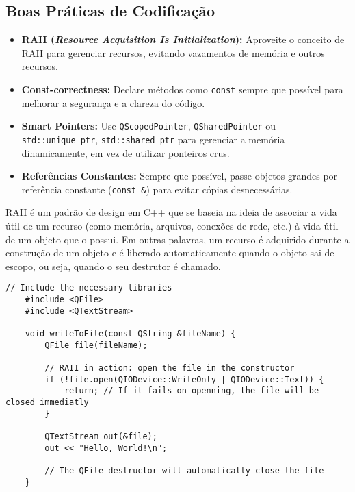 \documentclass[a4paper,11pt]{article}
\begin{document}
\subsection{Boas Práticas de Codificação}
\begin{itemize}
	\item \textbf{RAII (\textit{Resource Acquisition Is Initialization}):} Aproveite o conceito de RAII para gerenciar recursos, evitando vazamentos de memória e outros recursos.
	
	\item \textbf{Const-correctness:} Declare métodos como \texttt{const} sempre que possível para melhorar a segurança e a clareza do código.
	
	\item \textbf{Smart Pointers:} Use \texttt{QScopedPointer}, \texttt{QSharedPointer} ou \texttt{std::unique\_ptr}, \texttt{std::shared\_ptr} para gerenciar a memória dinamicamente, em vez de utilizar ponteiros crus.
	
	\item \textbf{Referências Constantes:} Sempre que possível, passe objetos grandes por referência constante (\texttt{const \&}) para evitar cópias desnecessárias.
\end{itemize}

RAII é um padrão de design em C++ que se baseia na ideia de associar a vida útil de um recurso (como memória, arquivos, conexões de rede, etc.) à vida útil de um objeto que o possui. Em outras palavras, um recurso é adquirido durante a construção de um objeto e é liberado automaticamente quando o objeto sai de escopo, ou seja, quando o seu destrutor é chamado.


\begin{lstlisting}[style=raii]
	// Include the necessary libraries
	#include <QFile>
	#include <QTextStream>
	
	void writeToFile(const QString &fileName) {
		QFile file(fileName);
		
		// RAII in action: open the file in the constructor
		if (!file.open(QIODevice::WriteOnly | QIODevice::Text)) {
			return; // If it fails on openning, the file will be closed immediatly
		}
		
		QTextStream out(&file);
		out << "Hello, World!\n";
		
		// The QFile destructor will automatically close the file
	}
\end{lstlisting}
\end{document}
